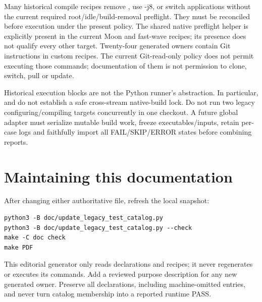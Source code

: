 Many historical compile recipes remove , use -j8, or switch
applications without the current required root/idle/build-removal preflight.
They must be reconciled before execution under the present policy.
The shared native preflight helper is explicitly present in the current Moon
and fast-wave recipes; its presence does not qualify every other target.
Twenty-four generated owners contain Git instructions in custom recipes.
The current Git-read-only policy does not permit executing those commands;
documentation of them is not permission to clone, switch, pull or update.

Historical execution blocks are not the Python runner's 
abstraction. In particular,  and
 do not establish a safe cross-stream native-build
lock. Do not run two legacy configuring/compiling targets concurrently in
one checkout. A future global adapter must serialize mutable build work,
freeze executables/inputs, retain per-case logs and faithfully import all
FAIL/SKIP/ERROR states before combining reports.

\section{Maintaining this documentation}
After changing either authoritative file, refresh the local snapshot:
\begin{lstlisting}
python3 -B doc/update_legacy_test_catalog.py
python3 -B doc/update_legacy_test_catalog.py --check
make -C doc check
make PDF
\end{lstlisting}
This editorial generator only reads declarations and recipes; it never
regenerates  or executes its commands. Add a reviewed
purpose description for any new generated owner. Preserve all declarations,
including machine-omitted entries, and never turn catalog membership into
a reported runtime PASS.
